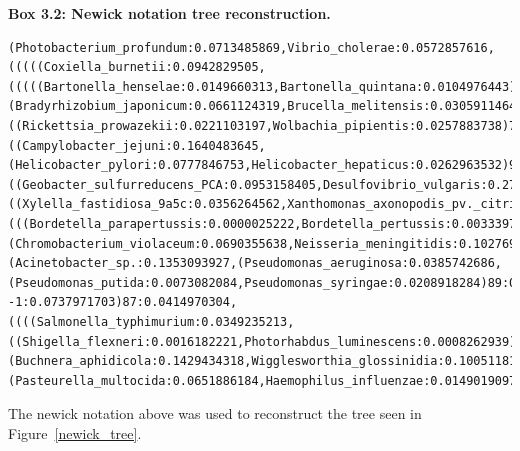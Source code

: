 \begin{framed}
\textbf{Box 3.2: Newick notation tree reconstruction.}\\
\begin{verbatim}
(Photobacterium_profundum:0.0713485869,Vibrio_cholerae:0.0572857616,(((((Coxiella_burnetii:0.0942829505,(((((Bartonella_henselae:0.0149660313,Bartonella_quintana:0.0104976443)100:0.0417236852,(Bradyrhizobium_japonicum:0.0661124319,Brucella_melitensis:0.0305911464)84:0.0159603838)100:0.0717972517,Caulobacter_crescentus_CB15:0.1317093492)89:0.0321405560,((Rickettsia_prowazekii:0.0221103197,Wolbachia_pipientis:0.0257883738)76:0.0009060796,Rickettsia_conorii:0.0023047443)100:0.1908928012)100:0.1212044773,((Campylobacter_jejuni:0.1640483645,(Helicobacter_pylori:0.0777846753,Helicobacter_hepaticus:0.0262963532)97:0.0750887828)100:0.3046033428,((Geobacter_sulfurreducens_PCA:0.0953158405,Desulfovibrio_vulgaris:0.2786904064)52:0.0512359438,Bdellovibrio_bacteriovorus:0.2548155296)65:0.0488493427)81:0.0360783687)100:0.0960879477)74:0.0330231208,((Xylella_fastidiosa_9a5c:0.0356264562,Xanthomonas_axonopodis_pv._citri:0.0296447972)100:0.0938726215,(((Bordetella_parapertussis:0.0000025222,Bordetella_pertussis:0.0033397334)100:0.0907958037,Ralstonia_solanacearum:0.0732876166)100:0.0326570294,(Chromobacterium_violaceum:0.0690355638,Neisseria_meningitidis:0.1027698727)75:0.0194002885)100:0.1171829439)81:0.0311798765)91:0.0328742881,(Acinetobacter_sp.:0.1353093927,(Pseudomonas_aeruginosa:0.0385742686,(Pseudomonas_putida:0.0073082084,Pseudomonas_syringae:0.0208918284)89:0.0075987307)100:0.0665927895)63:0.0151201359)100:0.0903890667,Shewanella_oneidensis_MR -1:0.0737971703)87:0.0414970304,((((Salmonella_typhimurium:0.0349235213,((Shigella_flexneri:0.0016182221,Photorhabdus_luminescens:0.0008262939)99:0.0086172615,Escherichia_coli_K12:0.0013793749)99:0.0106569199)99:0.0258934845,Yersinia_pestis:0.0509601305)88:0.0118616315,(Buchnera_aphidicola:0.1429434318,Wigglesworthia_glossinidia:0.1005118155)97:0.0480006109)96:0.0237936348,(Pasteurella_multocida:0.0651886184,Haemophilus_influenzae:0.0149019097)100:0.1377125957)90:0.0198366913)76:0.0112703769);
\end{verbatim}

The newick notation above was used to reconstruct the tree seen in Figure~\ref{newick_tree}.


\end{framed}
